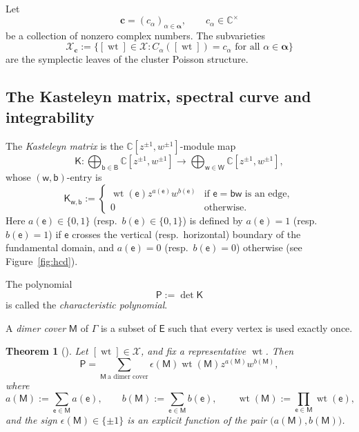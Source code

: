 \documentclass[dvipsnames,11pt]{article}
\newtheorem{theorem}{Theorem}[section]
\theoremstyle{definition}
\newcommand{\wt}{\operatorname{wt}}
\newcommand{\C}{{\mathbb C}}
\def\B{\mathsf B}
\def\W{\mathsf W}
\def\w{\mathsf w}
\def\b{\mathsf b}
\def\e{\mathsf e}
\def\K{\mathsf K}
\def\E{\mathsf E}
\def\graph{\Gamma}
\def\zz{\bm \alpha}
\begin{document}
Let 
\[
\bm c = (c_\alpha)_{\alpha \in \zz}, \qquad c_\alpha \in \C^\times
\]
be a collection of nonzero complex numbers. The subvarieties
\[
\mathcal X_{\bm c} := \{[\wt] \in \mathcal X: C_\alpha([\wt]) = c_\alpha \text{ for all } \alpha \in \zz\}
\]
are the symplectic leaves of the cluster Poisson structure.





\subsection{The Kasteleyn matrix, spectral curve and integrability}


The \emph{Kasteleyn matrix} is the $\C[z^{\pm1},w^{\pm1}]$-module map
\begin{equation}\label{eq:::kast}
\K:\bigoplus_{\b\in \B}\C[z^{\pm1},w^{\pm1}]
\rightarrow
\bigoplus_{\w\in \W}\C[z^{\pm1},w^{\pm1}],
\end{equation}
whose $(\w,\b)$-entry is
\[
\K_{\w,\b}
:= \begin{cases}
\wt(\e) z^{a(\e)} w^{b(\e)} &\text{if $\e = \b \w$ is an edge},\\
0 &\text{otherwise}.
\end{cases}
\]
Here $a(\e)\in\{0,1\}$ (resp.\ $b(\e)\in\{0,1\}$) is defined by $a(\e)=1$ (resp.\ $b(\e)=1$) if $\e$
crosses the vertical (resp.\ horizontal) boundary of the fundamental domain, and $a(\e)=0$ (resp.\ $b(\e)=0$)
otherwise (see Figure~\ref{fig:hcd}).  

The polynomial
\[
\mathsf P:=\det \K
\]
is called the \textit{characteristic polynomial}.

A \emph{dimer cover} $\mathsf M$ of $\graph$ is a subset of $\E$ such that every vertex is used exactly once. 

\begin{theorem}[\cite{Kast}]
Let $[\wt]\in\mathcal X$, and fix a representative $\wt$. Then 
\[
\mathsf P = \sum_{\mathsf M\ \text{a dimer cover}} \epsilon(\mathsf M)\wt(\mathsf M) z^{a(\mathsf M)} w^{b(\mathsf M)},
\]
where
\[
a(\mathsf M):=\sum_{\e\in\mathsf M} a(\e),\qquad 
b(\mathsf M):=\sum_{\e\in\mathsf M} b(\e),\qquad
\wt(\mathsf M):=\prod_{\e\in\mathsf M}\wt(\e),
\]
and the sign $\epsilon(\mathsf M)\in\{\pm1\}$ is an explicit function of the pair $\bigl(a(\mathsf M),b(\mathsf M)\bigr)$.
\end{theorem}
\end{document}
